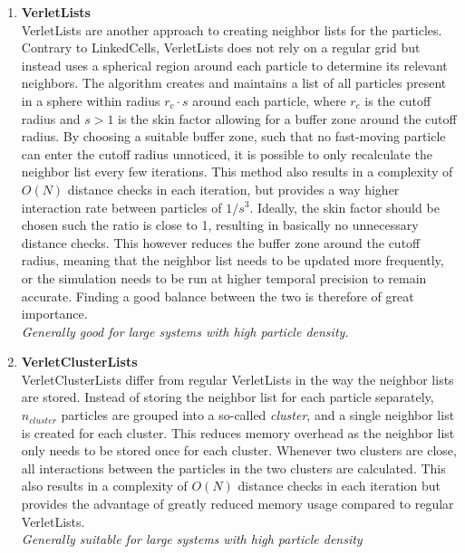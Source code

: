\begin{enumerate}[label=\textbf{\arabic*.}]
\begin{enumerate}
                  \item \textbf{VerletLists} \\
                        VerletLists are another approach to creating neighbor lists for the particles. Contrary to LinkedCells, VerletLists does not rely on a regular grid but instead uses a spherical region around each particle to determine its relevant neighbors. The algorithm creates and maintains a list of all particles present in a sphere within radius $r_c \cdot s$ around each particle, where $r_c$ is the cutoff radius and $s>1$ is the skin factor allowing for a buffer zone around the cutoff radius.
                        By choosing a suitable buffer zone, such that no fast-moving particle can enter the cutoff radius unnoticed, it is possible to only recalculate the neighbor list every few iterations. This method also results in a complexity of $O(N)$ distance checks in each iteration, but provides a way higher interaction rate between particles of $1/s^3$. Ideally, the skin factor should be chosen such the ratio is close to 1, resulting in basically no unnecessary distance checks. This however reduces the buffer zone around the cutoff radius, meaning that the neighbor list needs to be updated more frequently, or the simulation needs to be run at higher temporal precision to remain accurate. Finding a good balance between the two is therefore of great importance.\\
                        \textit{Generally good for large systems with high particle density.}

                  \item \textbf{VerletClusterLists} \\
                        VerletClusterLists differ from regular VerletLists in the way the neighbor lists are stored. Instead of storing the neighbor list for each particle separately, $n_{cluster}$ particles are grouped into a so-called \emph{cluster}, and a single neighbor list is created for each cluster. This reduces memory overhead as the neighbor list only needs to be stored once for each cluster. Whenever two clusters are close, all interactions between the particles in the two clusters are calculated. This also results in a complexity of $O(N)$ distance checks in each iteration but provides the advantage of greatly reduced memory usage compared to regular VerletLists.\\
                        \textit{Generally suitable for large systems with high particle density}

            \end{enumerate}


\end{enumerate}
